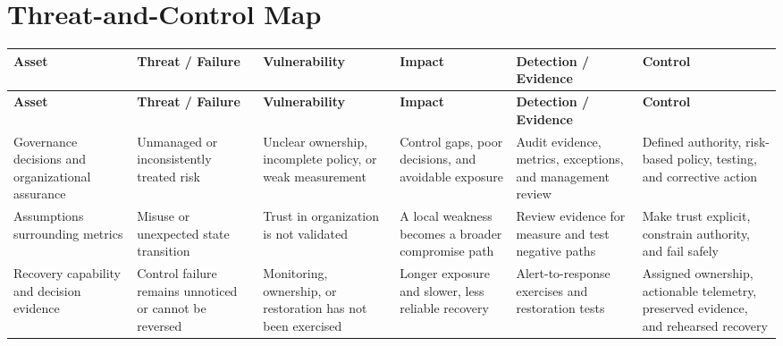 \documentclass[11pt]{article}
\begin{document}
\section*{Threat-and-Control Map}
\begingroup\scriptsize\setlength{\tabcolsep}{2pt}
\begin{longtable}{>{\RaggedRight\arraybackslash}p{}>{\RaggedRight\arraybackslash}p{}>{\RaggedRight\arraybackslash}p{}>{\RaggedRight\arraybackslash}p{}>{\RaggedRight\arraybackslash}p{}>{\RaggedRight\arraybackslash}p{}}
\toprule\rowcolor{Navy}\color{white}\textbf{Asset} & \color{white}\textbf{Threat / Failure} & \color{white}\textbf{Vulnerability} & \color{white}\textbf{Impact} & \color{white}\textbf{Detection / Evidence} & \color{white}\textbf{Control}\\\midrule
\endfirsthead
\toprule\rowcolor{Navy}\color{white}\textbf{Asset} & \color{white}\textbf{Threat / Failure} & \color{white}\textbf{Vulnerability} & \color{white}\textbf{Impact} & \color{white}\textbf{Detection / Evidence} & \color{white}\textbf{Control}\\\midrule
\endhead
Governance decisions and organizational assurance & Unmanaged or inconsistently treated risk & Unclear ownership, incomplete policy, or weak measurement & Control gaps, poor decisions, and avoidable exposure & Audit evidence, metrics, exceptions, and management review & Defined authority, risk-based policy, testing, and corrective action\\\midrule
Assumptions surrounding metrics & Misuse or unexpected state transition & Trust in organization is not validated & A local weakness becomes a broader compromise path & Review evidence for measure and test negative paths & Make trust explicit, constrain authority, and fail safely\\\midrule
Recovery capability and decision evidence & Control failure remains unnoticed or cannot be reversed & Monitoring, ownership, or restoration has not been exercised & Longer exposure and slower, less reliable recovery & Alert-to-response exercises and restoration tests & Assigned ownership, actionable telemetry, preserved evidence, and rehearsed recovery\\\midrule
\bottomrule
\end{longtable}
\endgroup
\end{document}
